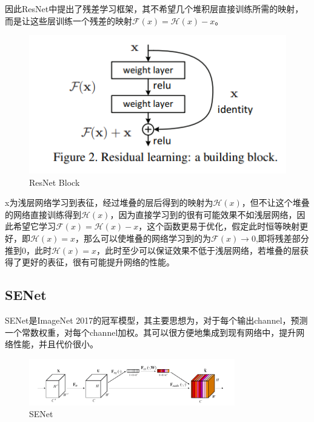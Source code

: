\documentclass{article}
\begin{document}
因此ResNet中提出了残差学习框架，其不希望几个堆积层直接训练所需的映射，而是让这些层训练一个残差的映射$\mathcal{F}(x)=\mathcal{H}(x)-x$。
\begin{figure}[H]
    \begin{center}
        \includegraphics[width=12cm]{figures/ResNetBlock.png}
        \caption{ResNet Block}
        \label{fig:2}
    \end{center}
\end{figure}
\par

x为浅层网络学习到表征，经过堆叠的层后得到的映射为$\mathcal{H}(x)$，但不让这个堆叠的网络直接训练得到$\mathcal{H}(x)$，因为直接学习到的很有可能效果不如浅层网络，因此希望它学习$\mathcal{F}(x)=\mathcal{H}(x)-x$，这个函数更易于优化，假定此时恒等映射更好，即$\mathcal{H}(x)=x$，那么可以使堆叠的网络学习到的为$\mathcal{F}(x){\rightarrow}0$,即将残差部分推到0，此时$\mathcal{H}(x)=x$，此时至少可以保证效果不低于浅层网络，若堆叠的层获得了更好的表征，很有可能提升网络的性能。

\subsection{SENet}

SENet\cite{hu2018squeeze}是ImageNet 2017的冠军模型，其主要思想为，对于每个输出channel，预测一个常数权重，对每个channel加权。其可以很方便地集成到现有网络中，提升网络性能，并且代价很小。

\begin{figure}[H]
    \centering
    \includegraphics[width=0.8\textwidth]{figures/senet.png}
    \caption{SENet}
\end{figure}
\end{document}
